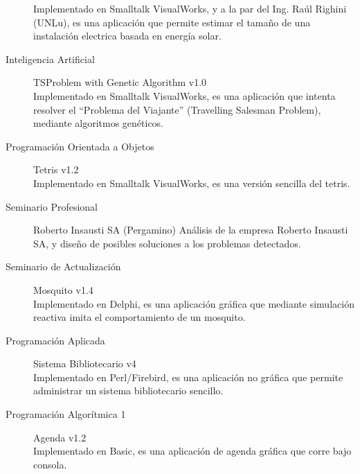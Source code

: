 \documentclass[a4paper]{article}
\begin{document}
\begin{description}
Implementado en Smalltalk VisualWorks, y a la par del Ing. Raúl Righini (UNLu),  es una aplicación que permite estimar el tamaño de una instalación electrica basada en energía solar.
\item [ Inteligencia Artificial ] TSProblem with Genetic Algorithm v1.0\\
Implementado en Smalltalk VisualWorks, es una aplicación que intenta resolver el ``Problema del Viajante'' (Travelling Salesman Problem), mediante algoritmos genéticos.
\item [ Programación Orientada a Objetos ] Tetris v1.2\\
Implementado en Smalltalk VisualWorks, es una versión sencilla del tetris.
\item [ Seminario Profesional ] Roberto Insausti SA (Pergamino)
Análisis de la empresa Roberto Insausti SA, y diseño de posibles soluciones a los problemas detectados.
\item [ Seminario de Actualización ] Mosquito v1.4\\
Implementado en Delphi, es una aplicación gráfica que mediante simulación reactiva imita el comportamiento de un mosquito.
\item [ Programación Aplicada ] Sistema Bibliotecario v4\\
Implementado en Perl/Firebird, es una aplicación no gráfica que permite administrar un sistema bibliotecario sencillo.
\item [ Programación Algorítmica 1 ] Agenda v1.2\\
Implementado en Basic, es una aplicación de agenda gráfica que corre bajo consola.
\end{description}
\end{document}
